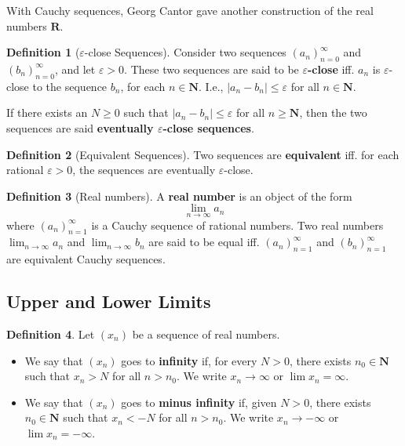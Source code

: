 \documentclass[12pt,a4paper]{article}
\theoremstyle{definition}
\newtheorem{proposition}[theorem]{Proposition}
\newtheorem{definition}{Definition}[section]
\begin{document}
With Cauchy sequences, Georg Cantor gave another construction of the real numbers $\textbf{R}$.

\begin{definition}[$\varepsilon$-close Sequences]
  Consider two sequences $(a_n)_{n=0}^\infty$ and $(b_n)_{n=0}^\infty$, and let $\varepsilon > 0$. These two sequences are said to be \textbf{$\varepsilon$-close} iff. $a_n$ is $\varepsilon$-close to the sequence $b_n$, for each $n \in \textbf{N}$. I.e., $|a_n - b_n| \leq \varepsilon$ for all $n \in \textbf{N}$.

  If there exists an $N \geq 0$ such that $|a_n - b_n| \leq \varepsilon$ for all $n \geq \textbf{N}$, then the two sequences are said \textbf{eventually $\varepsilon$-close sequences}.
\end{definition}

\begin{definition}[Equivalent Sequences]
  Two sequences are \textbf{equivalent} iff. for each rational $\varepsilon > 0$, the sequences are eventually $\varepsilon$-close.
\end{definition}


\begin{definition}[Real numbers]
  A \textbf{real number} is an object of the form
  \[
    \lim_{n \to \infty} a_n
  \]
  where $(a_n)_{n=1}^\infty$ is a Cauchy sequence of rational numbers. Two real numbers $\lim_{n \to \infty} a_n$ and $\lim_{n \to \infty} b_n$ are said to be equal iff. $(a_n)_{n=1}^\infty$ and $(b_n)_{n=1}^\infty$ are equivalent Cauchy sequences.
\end{definition}

\subsection{Upper and Lower Limits}

\begin{definition}
	Let $(x_n)$ be a sequence of real numbers. 
	\begin{itemize}
		\item We say that $(x_n)$ goes to \textbf{infinity} if, for every $N > 0$, there exists $n_0 \in \textbf{N}$ such that $x_n > N$ for all $n > n_0$. We write $x_n \longrightarrow \infty$ or $\lim x_n = \infty$.
		\item We say that $(x_n)$ goes to \textbf{minus infinity} if, given $N > 0$, there exists $n_0 \in \textbf{N}$ such that $x_n < -N$ for all $n > n_0$. We write $x_n \longrightarrow - \infty$ or $\lim x_n = - \infty$.
	\end{itemize}
\end{definition}
\end{document}
